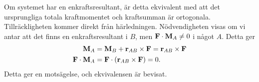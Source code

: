 Om systemet har en enkraftsresultant, är detta ekvivalent med att det ursprungliga totala kraftmomentet och kraftsumman är ortogonala. Tillräckligheten kommer direkt från härledningen. Nödvendigheten visas om vi antar att det finns en enkraftsresultant i $B$, men $\vect{F}\cdot\vect{M}_A\neq 0$ i något $A$. Detta ger
\begin{align*}
	\vect{M}_A              &= \vect{M}_B + \vect{r}_{AB}\times\vect{F} = \vect{r}_{AB}\times\vect{F} \\
	\vect{F}\cdot\vect{M}_A &= \vect{F}\cdot(\vect{r}_{AB}\times\vect{F}) = 0.
\end{align*}
Detta ger en motsägelse, och ekvivalensen är bevisat.